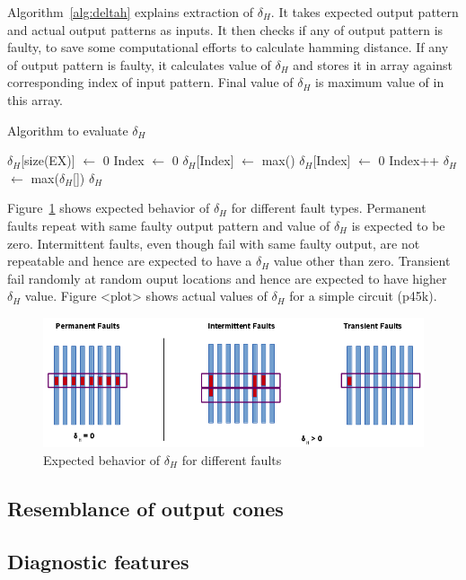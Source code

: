 Algorithm~\ref{alg:deltah} explains extraction of $\delta_H$. It takes expected output pattern and actual output patterns as inputs. It then checks if any of output pattern is faulty, to save some computational efforts to calculate hamming distance. If  any of output pattern is faulty, it calculates value of $\delta_H$ and stores it in array against corresponding index of input pattern. Final value of $\delta_H$ is maximum value of in this array. 

\begin{algorithm}[H]
  \caption{Algorithm to evaluate $\delta_H$}
  \label{alg:deltah}
  \begin{algorithmic}
 \State $\delta_H$[size(EX)] $\leftarrow$ 0\;
 \State Index $\leftarrow$ 0\;
   \State $\delta_H$[Index] $\leftarrow$ max()\;
  \Else
   \State $\delta_H$[Index] $\leftarrow$ 0\;
  \EndIf
  \State Index++\;
 \EndWhile
 \State$\delta_H$ $\leftarrow$ max($\delta_H$[])\;
 \State \Return $\delta_H$\;
 \EndProcedure
 \end{algorithmic}
\end{algorithm}

Figure~\ref{fig:deltah} shows expected behavior of $\delta_H$ for different fault types. Permanent faults repeat with same faulty output pattern and value of $\delta_H$ is expected to be zero. Intermittent faults, even though fail with same faulty output, are not repeatable and hence are expected to have a $\delta_H$ value other than zero. Transient fail randomly at random ouput locations and hence are expected to have higher $\delta_H$ value. Figure <plot> shows actual values of $\delta_H$ for a simple circuit (p45k).

\begin{figure}[h]
  \begin{center}
    \captionsetup{justification=centering}
    \includegraphics[scale=1.00]{figures/deltah.png}
    \caption{Expected behavior of $\delta_H$ for different faults}
    \label{fig:deltah}
  \end{center}
\end{figure}


\subsection{Resemblance of output cones}

\subsection{Diagnostic features}


